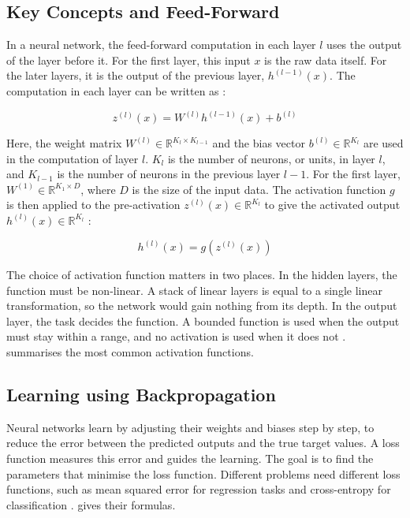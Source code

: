 \subsection{Key Concepts and Feed-Forward}

In a neural network, the feed-forward computation in each layer \( l \) uses the output of the layer before it. For the first layer, this input \( x \) is the raw data itself. For the later layers, it is the output of the previous layer, \( h^{(l-1)}(x) \). The computation in each layer can be written as \cite{goodfellow_deep_2016}:

\begin{equation}
z^{(l)}(x) = W^{(l)} h^{(l-1)}(x) + b^{(l)}
\end{equation}

Here, the weight matrix \( W^{(l)} \in \mathbb{R}^{K_l \times K_{l-1}} \) and the bias vector \( b^{(l)} \in \mathbb{R}^{K_l} \) are used in the computation of layer \( l \). \( K_l \) is the number of neurons, or units, in layer \( l \), and \( K_{l-1} \) is the number of neurons in the previous layer \( l-1 \). For the first layer, \( W^{(1)} \in \mathbb{R}^{K_1 \times D} \), where \( D \) is the size of the input data. The activation function \( g \) is then applied to the pre-activation \( z^{(l)}(x) \in \mathbb{R}^{K_l} \) to give the activated output \( h^{(l)}(x) \in \mathbb{R}^{K_l} \) \cite{goodfellow_deep_2016}:

\begin{equation}
h^{(l)}(x) = g(z^{(l)}(x))
\end{equation}

The choice of activation function matters in two places. In the hidden layers, the function must be non-linear. A stack of linear layers is equal to a single linear transformation, so the network would gain nothing from its depth. In the output layer, the task decides the function. A bounded function is used when the output must stay within a range, and no activation is used when it does not \cite{goodfellow_deep_2016}.  summarises the most common activation functions.



\subsection{Learning using Backpropagation}

Neural networks learn by adjusting their weights and biases step by step, to reduce the error between the predicted outputs and the true target values. A loss function measures this error and guides the learning. The goal is to find the parameters that minimise the loss function. Different problems need different loss functions, such as mean squared error for regression tasks and cross-entropy for classification \cite{goodfellow_deep_2016}.  gives their formulas.

